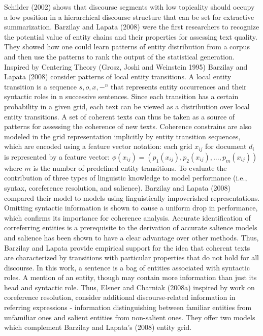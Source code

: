 Schilder (2002) shows that discourse segments with low topicality should occupy a low position in a hierarchical discourse structure that can be set for extractive summarization. 
Barzilay and Lapata (2008) were the first researchers to recognize the potential value of entity chains and their properties for assessing text quality. 
They showed how one could learn patterns of entity distribution from a corpus and then use the patterns to rank the output of the statistical generation. 
Inspired by Centering Theory  (Grosz, Joshi and Weinstein 1995) Barzilay and Lapata (2008) consider patterns of local entity transitions. 
A local entity transition is a sequence ${s,o,x,-}^n$ that represents entity occurrences and their syntactic roles in n successive sentences. 
Since each transition has a certain probability in a given grid, each text can be viewed as a distribution over local entity transitions. 
A set of coherent texts can thus be taken as a source of patterns for assessing the coherence of new texts. 
Coherence constrains are also modeled in the grid representation implicitly by entity transition sequences, which are encoded using a feature vector notation: each grid $x_{ij}$ for document $d_i$ is represented by a feature vector:
$ \phi(x_{ij}) = (p_1(x_{ij}),p_2(x_{ij}),...,p_m(x_{ij}))$
where $m$ is the number of predefined entity transitions. 
To evaluate the contribution of three types of linguistic knowledge to model performance (i.e., syntax, coreference resolution, and salience). Barzilay and Lapata (2008) compared their model to models using linguistically impoverished representations. 
Omitting syntactic information is shown to cause a uniform drop in performance, which confirms its importance for coherence analysis. 
Accurate identification of correferring entities is a prerequisite to the derivation of accurate salience models and salience has been shown to have a clear advantage over other methods. 
Thus, Barzilay and Lapata provide empirical support for the idea that coherent texts are characterized by transitions with particular properties that do not hold for all discourse. 
In this work, a sentence is a bag of entities associated with syntactic roles. 
A mention of an entity, though may contain more information than just its head and syntactic role. 
Thus, Elsner and Charniak (2008a) inspired by work on coreference resolution, consider additional discourse-related information in referring expressions - information distinguishing between familiar entities from unfamiliar ones and salient entities from non-salient ones.   
They offer two models which complement Barzilay and Lapata's (2008) entity grid. 
